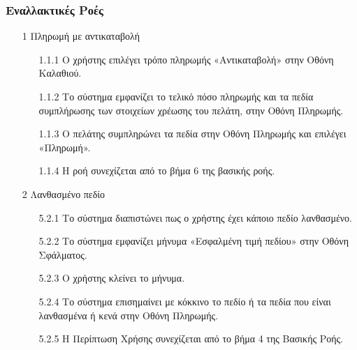 \documentclass[12pt,a4paper,twoside]{book}
\begin{document}
\subsubsection{Εναλλακτικές Ροές}
\begin{enumerate}
  \item[1 ] Πληρωμή με αντικαταβολή  %
        \begin{enumerate}
          \item[1.1.1 ] Ο χρήστης επιλέγει τρόπο πληρωμής «Αντικαταβολή» στην Οθόνη Καλαθιού. %
          \item[1.1.2 ] Το σύστημα εμφανίζει το τελικό πόσο πληρωμής και τα πεδία συμπλήρωσης των στοιχείων χρέωσης του πελάτη, στην Οθόνη Πληρωμής. %
          \item[1.1.3 ] Ο πελάτης συμπληρώνει τα πεδία στην Οθόνη Πληρωμής και επιλέγει «Πληρωμή». %
          \item[1.1.4 ] Η ροή συνεχίζεται από το βήμα 6 της βασικής ροής. %
        \end{enumerate}
  \item[2 ] Λανθασμένο πεδίο %
        \begin{enumerate}
          \item[5.2.1 ] Το σύστημα διαπιστώνει πως ο χρήστης έχει κάποιο πεδίο λανθασμένο. %
          \item[5.2.2 ] Το σύστημα εμφανίζει μήνυμα «Εσφαλμένη τιμή πεδίου» στην Οθόνη Σφάλματος. %
          \item[5.2.3 ] Ο χρήστης κλείνει το μήνυμα. %
          \item[5.2.4 ] Το σύστημα επισημαίνει με κόκκινο το πεδίο ή τα πεδία που είναι λανθασμένα ή κενά στην Οθόνη Πληρωμής. %
          \item[5.2.5 ] Η Περίπτωση Χρήσης συνεχίζεται από το βήμα 4 της Βασικής Ροής.

\end{enumerate}
\end{enumerate}
\end{document}

